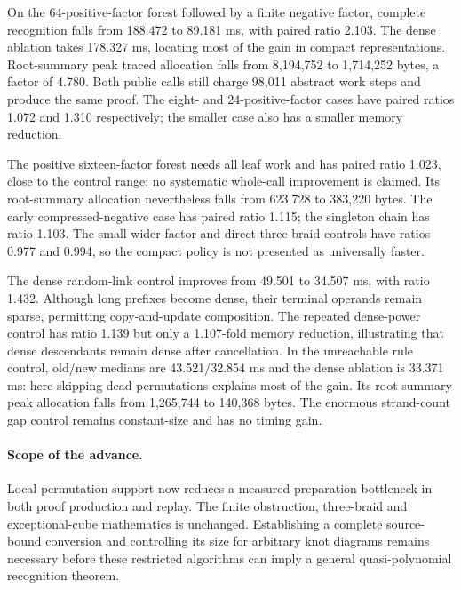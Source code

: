 On the 64-positive-factor forest followed by a finite negative factor,
complete recognition falls from 188.472 to 89.181 ms, with paired ratio
2.103. The dense ablation takes 178.327 ms, locating most of the gain in
compact representations. Root-summary peak traced allocation falls from
8,194,752 to 1,714,252 bytes, a factor of 4.780. Both public calls still charge
98,011 abstract work steps and produce the same proof. The eight- and
24-positive-factor cases have paired ratios 1.072 and 1.310 respectively;
the smaller case also has a smaller memory reduction.

The positive sixteen-factor forest needs all leaf work and has paired ratio
1.023, close to the control range; no systematic whole-call improvement is
claimed. Its root-summary allocation nevertheless falls from 623,728 to
383,220 bytes. The early compressed-negative case has paired ratio 1.115;
the singleton chain has ratio 1.103. The small wider-factor and direct
three-braid controls have ratios 0.977 and 0.994, so the compact policy is
not presented as universally faster.

The dense random-link control improves from 49.501 to 34.507 ms, with ratio
1.432. Although long prefixes become dense, their terminal operands remain
sparse, permitting copy-and-update composition. The repeated dense-power
control has ratio 1.139 but only a 1.107-fold memory reduction, illustrating
that dense descendants remain dense after cancellation. In the unreachable
rule control, old/new medians are 43.521/32.854 ms and the dense ablation is
33.371 ms: here skipping dead permutations explains most of the gain. Its
root-summary peak allocation falls from 1,265,744 to 140,368 bytes. The enormous
strand-count gap control remains constant-size and has no timing gain.

\paragraph{Scope of the advance.}
Local permutation support now reduces a measured preparation bottleneck in
both proof production and replay. The finite obstruction, three-braid and
exceptional-cube mathematics is unchanged. Establishing a complete source-bound
conversion and controlling its size for arbitrary knot diagrams remains
necessary before these restricted algorithms can imply a general
quasi-polynomial recognition theorem.
